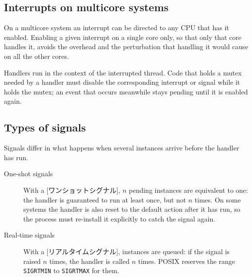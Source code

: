 \documentclass[../main.tex]{subfiles}
\begin{document}
\subsection{Interrupts on multicore systems}

On a multicore system an interrupt can be directed to any CPU that has it
enabled.  Enabling a given interrupt on a single core only, so that only
that core handles it, avoids the overhead and the perturbation that
handling it would cause on all the other cores.

\begin{keypoint}
  Handlers run in the context of the interrupted thread.  Code that holds
  a mutex needed by a handler must disable the corresponding interrupt or
  signal while it holds the mutex; an event that occurs meanwhile stays
  pending until it is enabled again.
\end{keypoint}

\subsection{Types of signals}
\label{sec:l05-types}

Signals differ in what happens when several instances arrive before the
handler has run.
\begin{description}
  \item[One-shot signals] With a [ワンショットシグナル],
    $n$ pending instances are equivalent to one: the handler is guaranteed
    to run at least once, but not $n$ times.  On some systems the handler
    is also reset to the default action after it has run, so the process
    must re-install it explicitly to catch the signal again.
  \item[Real-time signals] With a
    [リアルタイムシグナル], instances are queued:
    if the signal is raised $n$ times, the handler is called $n$ times.
    POSIX reserves the range \texttt{SIGRTMIN} to \texttt{SIGRTMAX} for
    them.
\end{description}
\end{document}

